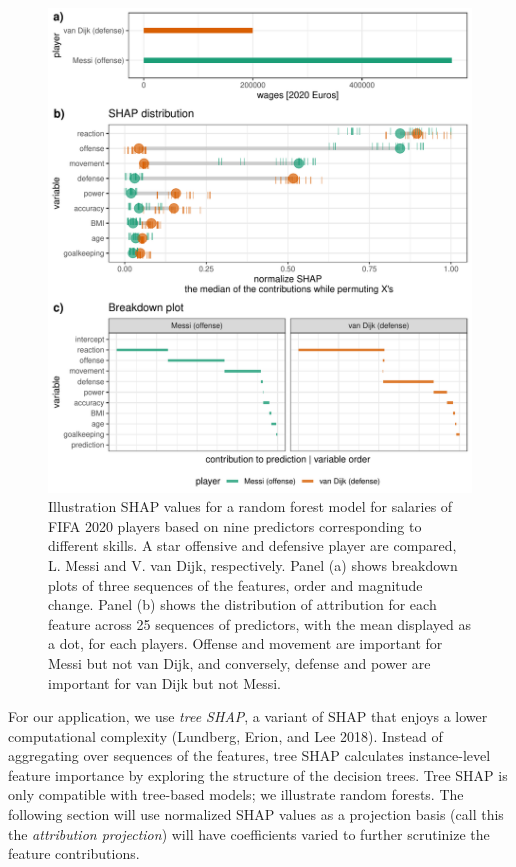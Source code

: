 \documentclass[
]{article}
\begin{document}
\begin{figure}

{\centering \includegraphics[width=1\linewidth]{./figures/shap_distr_bd} 

}

\caption{Illustration SHAP values for a random forest model for salaries of FIFA 2020 players based on nine predictors corresponding to different skills. A star offensive and defensive player are compared, L. Messi and V. van Dijk, respectively. Panel (a) shows breakdown plots of three sequences of the features, order and magnitude change. Panel (b) shows the distribution of attribution for each feature across 25 sequences of predictors, with the mean displayed as a dot, for each players. Offense and movement are important for Messi but not van Dijk, and conversely, defense and power are important for van Dijk but not Messi.}\label{fig:shapdistrbd}
\end{figure}

For our application, we use \emph{tree SHAP}, a variant of SHAP that enjoys a lower computational complexity (Lundberg, Erion, and Lee 2018). Instead of aggregating over sequences of the features, tree SHAP calculates instance-level feature importance by exploring the structure of the decision trees. Tree SHAP is only compatible with tree-based models; we illustrate random forests. The following section will use normalized SHAP values as a projection basis (call this the \emph{attribution projection}) will have coefficients varied to further scrutinize the feature contributions.
\end{document}
